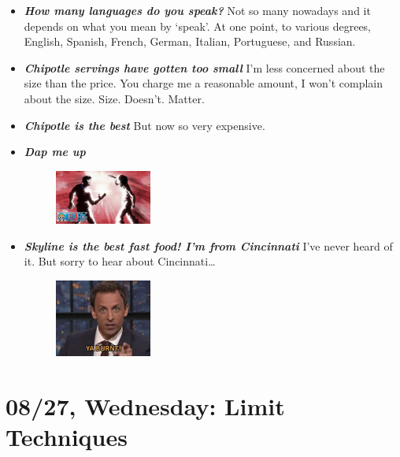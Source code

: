 \documentclass[11pt,letterpaper]{article}
\begin{document}
\begin{itemize}
\item {\bfseries\itshape How many languages do you speak?} Not so many nowadays and it depends on what you mean by `speak'. At one point, to various degrees, English, Spanish, French, German, Italian, Portuguese, and Russian. 

\item {\bfseries\itshape Chipotle servings have gotten too small} I'm less concerned about the size than the price. You charge me a reasonable amount, I won't complain about the size. Size. Doesn't. Matter.

\item {\bfseries\itshape Chipotle is the best} But now so very expensive. 

\item {\bfseries\itshape Dap me up} 
	\begin{figure}[H]
	\centering
	\includegraphics[width=0.30\textwidth]{images/dap.jpg}
	\end{figure}

\item {\bfseries\itshape Skyline is the best fast food! I'm from Cincinnati} I've never heard of it. But sorry to hear about Cincinnati\dots
	\begin{figure}[H]
	\centering
	\includegraphics[width=0.30\textwidth]{images/burnt.png}
	\end{figure}
\end{itemize}

\newpage
\section*{08/27, Wednesday: Limit Techniques\label{08-27}}
\end{document}
